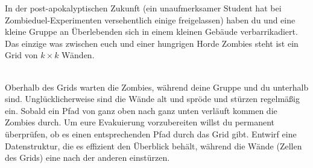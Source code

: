 \documentclass{uebung_cs}
\begin{document}
\begin{aufgabe}
	In der post-apokalyptischen Zukunft (ein unaufmerksamer Student hat bei Zombieduel-Experimenten versehentlich einige freigelassen) haben du und eine kleine Gruppe an Überlebenden sich in einem kleinen Gebäude verbarrikadiert.
	Das einzige was zwischen euch und einer hungrigen Horde Zombies steht ist ein Grid von $k\times k$ Wänden.\\\\
	\begin{center}
		\newcommand{\wallAt}[2]{
			\draw[fill=black!25,draw=none] (#1-0.45,#2*0.7+0.3) rectangle (#1+0.45,#2*0.7-0.3);
		}
		\hspace{0.7cm}
	\end{center}
	Oberhalb des Grids warten die Zombies, während deine Gruppe und du unterhalb sind.
	Unglücklicherweise sind die Wände alt und spröde und stürzen regelmäßig ein.
	Sobald ein Pfad von ganz oben nach ganz unten verläuft kommen die Zombies durch.
	Um eure Evakuierung vorzubereiten willst du permanent überprüfen, ob es einen entsprechenden Pfad durch das Grid gibt.
	Entwirf eine Datenstruktur, die es effizient den Überblick behält, während die Wände (Zellen des Grids) eine nach der anderen einstürzen.
\end{aufgabe}
\end{document}
